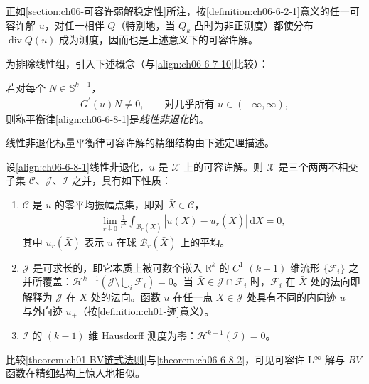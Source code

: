 \documentclass[../../main.tex]{subfiles}
\begin{document}
正如\cref{section:ch06-可容许弱解稳定性}所注，按\cref{definition:ch06-6-2-1}意义的任一可容许解 $u$，对任一相伴 $Q$（特别地，当 $Q_{k}$ 凸时为非正测度）都使分布 $\operatorname{div}Q(u)$ 成为测度，因而也是上述意义下的可容许解。


为排除线性组，引入下述概念（与\eqref{align:ch06-6-7-10}比较）：

\begin{definition}\label{definition:ch06-6-8-1}
若对每个 $N\in\mathbb{S}^{k-1}$，
\begin{align}
G^{\prime}(u)N\neq 0,\qquad\text{对几乎所有 }u\in(-\infty,\infty),
\label{align:ch06-6-8-4}
\end{align}
则称平衡律\eqref{align:ch06-6-8-1}是\emph{线性非退化}的。
\end{definition}

线性非退化标量平衡律可容许解的精细结构由下述定理描述。

\begin{theorem}\label{theorem:ch06-6-8-2}
设\eqref{align:ch06-6-8-1}线性非退化，$u$ 是 $\mathscr{X}$ 上的可容许解。则 $\mathscr{X}$ 是三个两两不相交子集 $\mathscr{C}$、$\mathscr{J}$、$\mathscr{I}$ 之并，具有如下性质：
\begin{enumerate}
\item[(a)] $\mathscr{C}$ 是 $u$ 的零平均振幅点集，即对 $\bar{X}\in\mathscr{C}$，
\begin{align}
\lim_{r\downarrow 0}\frac{1}{r^{k}}\int_{\mathscr{B}_{r}(\bar{X})}|u(X)-\bar{u}_{r}(\bar{X})|\,\mathrm{d}X=0,
\label{align:ch06-6-8-5}
\end{align}
其中 $\bar{u}_{r}(\bar{X})$ 表示 $u$ 在球 $\mathscr{B}_{r}(\bar{X})$ 上的平均。
\item[(b)] $\mathscr{J}$ 是可求长的，即它本质上被可数个嵌入 $\mathbb{R}^{k}$ 的 $C^{1}$ $(k-1)$ 维流形 $\{\mathscr{F}_{i}\}$ 之并所覆盖：$\mathscr{H}^{k-1}(\mathscr{J}\setminus\bigcup_{i}\mathscr{F}_{i})=0$。当 $\bar{X}\in\mathscr{J}\cap\mathscr{F}_{i}$ 时，$\mathscr{F}_{i}$ 在 $\bar{X}$ 处的法向即解释为 $\mathscr{J}$ 在 $\bar{X}$ 处的法向。函数 $u$ 在任一点 $\bar{X}\in\mathscr{J}$ 处具有不同的内向迹 $u_{-}$ 与外向迹 $u_{+}$（按\cref{definition:ch01-迹}意义）。

\item[(c)] $\mathscr{I}$ 的 $(k-1)$ 维 Hausdorff 测度为零：$\mathscr{H}^{k-1}(\mathscr{I})=0$。
\end{enumerate}
\end{theorem}

比较\cref{theorem:ch01-BV链式法则}与\cref{theorem:ch06-6-8-2}，可见可容许 L$^{\infty}$ 解与 $BV$ 函数在精细结构上惊人地相似。
\end{document}

